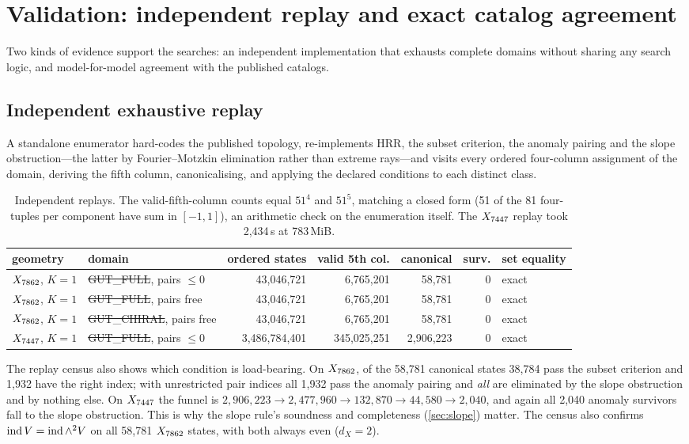 \section{Validation: independent replay and exact catalog agreement}
\label{sec:validation}

Two kinds of evidence support the searches: an independent implementation that
exhausts complete domains without sharing any search logic, and model-for-model
agreement with the published catalogs.

\subsection{Independent exhaustive replay}

A standalone enumerator hard-codes the published topology, re-implements HRR,
the subset criterion, the anomaly pairing and the slope obstruction---the latter
by Fourier--Motzkin elimination rather than extreme rays---and visits every
ordered four-column assignment of the domain, deriving the fifth column,
canonicalising, and applying the declared conditions to each distinct class.

\begin{table}[h]
\centering\footnotesize
\setlength{\tabcolsep}{3.5pt}
\begin{tabular}{@{}llrrrrl@{}}
\toprule
geometry & domain & ordered states & valid 5th col. & canonical & surv. & set equality \\
\midrule
$X_{7862}$, $K=1$ & \st{GUT\_FULL}, pairs $\le0$ & 43,046,721 & 6,765,201 & 58,781 & 0 & exact \\
$X_{7862}$, $K=1$ & \st{GUT\_FULL}, pairs free & 43,046,721 & 6,765,201 & 58,781 & 0 & exact \\
$X_{7862}$, $K=1$ & \st{GUT\_CHIRAL}, pairs free & 43,046,721 & 6,765,201 & 58,781 & 0 & exact \\
$X_{7447}$, $K=1$ & \st{GUT\_FULL}, pairs $\le0$ & 3,486,784,401 & 345,025,251 & 2,906,223 & 0 & exact \\
\bottomrule
\end{tabular}
\caption{Independent replays. The valid-fifth-column counts equal $51^4$ and
$51^5$, matching a closed form (51 of the 81 four-tuples per component have sum
in $[-1,1]$), an arithmetic check on the enumeration itself. The $X_{7447}$ replay
took 2,434\,s at 783\,MiB.}
\label{tab:replay}
\end{table}

The replay census also shows which condition is load-bearing. On $X_{7862}$, of the
58,781 canonical states 38,784 pass the subset criterion and 1,932 have the
right index; with unrestricted pair indices all 1,932 pass the anomaly pairing
and \emph{all} are eliminated by the slope obstruction and by nothing else. On
$X_{7447}$ the funnel is $2{,}906{,}223\to2{,}477{,}960\to132{,}870\to44{,}580\to2{,}040$,
and again all 2,040 anomaly survivors fall to the slope obstruction. This is why
the slope rule's soundness and completeness (\cref{sec:slope}) matter. The
census also confirms $\operatorname{ind} V=\operatorname{ind}\wedge^2V$ on all 58,781 $X_{7862}$ states, with both
always even ($d_X=2$).

